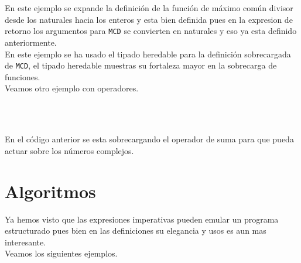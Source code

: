       \begin{fxcode}
         \\
         \\
      \end{fxcode}
      
      En este ejemplo se expande la definición de la función de máximo común divisor desde los naturales hacia los enteros y esta bien definida pues en la expresion de retorno los argumentos para \texttt{MCD} se convierten en naturales y eso ya esta definido anteriormente.
      \\
      
      En este ejemplo se ha usado el tipado heredable para la definición sobrecargada de \texttt{MCD}, el tipado heredable muestras su fortaleza mayor en la sobrecarga de funciones.
      \\
      
      Veamos otro ejemplo con operadores.
      
      \begin{fxcode}
         \\
         \\
      \end{fxcode}
      
      En el código anterior se esta sobrecargando el operador de suma para que pueda actuar sobre los números complejos.
      
   \section{Algoritmos}
      Ya hemos visto que las expresiones imperativas pueden emular un programa estructurado pues bien en las definiciones su elegancia y usos es aun mas interesante.
      \\
      
      Veamos los siguientes ejemplos.
      
      \begin{fxcode}
         \\
         \\
         \\
         \\
         \\
         \\
         \\
         \\
         \\
      \end{fxcode}
      
